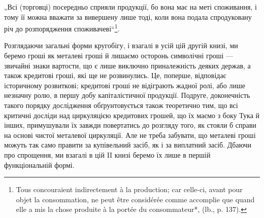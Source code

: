 „Всі (торговці) посередньо сприяли продукції, бо вона має на меті
споживання, і тому її можна вважати за вивершену лише тоді, коли
вона подала спродуковану річ до розпорядження споживачеві“\footnote*{
Tous concouraient indirectement à la production; car celle-ci, avant pour
objet la consommation, ne peut être considérée comme accomplie que quand elle a
mis la chose produite à la portée du consommateur*, (lb., p. 137).
}.

Розглядаючи загальні форми кругобігу, і взагалі в усій цій другій
книзі, ми беремо гроші як металеві гроші й лишаємо осторонь
символічні гроші — звичайні знаки вартости, що є лише виключно приналежність
деяких держав, а також кредитові гроші, які ще не розвинулись.
Це, поперше, відповідає історичному розвиткові; кредитові гроші
не відіграють жадної ролі, або лише незначну ролю, в першу добу капіталістичної
продукції. Подруге, доконечність такого порядку дослідження
обґрунтовується також теоретично тим, що всі критичні досліди над
циркуляцією кредитових грошей, що їх маємо з боку Тука й інших,
примушували їх завжди повертатись до розгляду того, як стояли б справи
на основі чистої металевої циркуляції. Але не треба забувати, що металеві
гроші можуть так само правити за купівельний засіб, як і за виплатний
засіб. Дбаючи про спрощення, ми взагалі в цій II книзі беремо їх лише
в першій функціональній формі.
